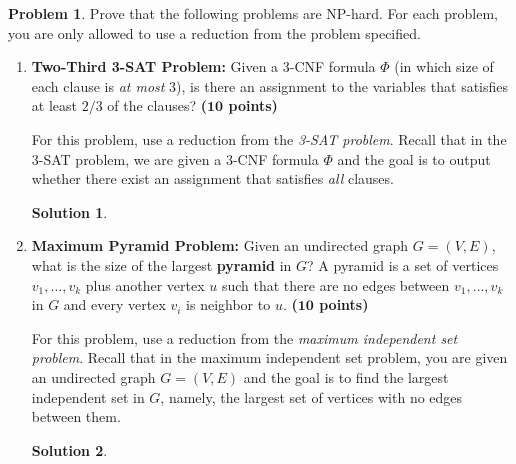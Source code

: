 \documentclass{article}
\theoremstyle{definition}
\newtheorem{problem}{Problem}
\newtheorem*{solution*}{Solution}
\newenvironment{solution}{\begin{solution*}}{{} \end{solution*}}
\newcommand{\grade}[1]{\hfill{\textbf{($\mathbf{#1}$ points)}}}
\begin{document}
\begin{problem}\label{NP}
	Prove that the following problems are NP-hard. For each problem, you are only allowed to use a reduction from the problem specified. 
	
	\begin{enumerate}[label=(\alph*)]
		\item \textbf{Two-Third 3-SAT Problem:} Given a 3-CNF formula $\Phi$ (in which size of each clause is \emph{at most} $3$), is there an assignment to the variables that satisfies at least $2/3$ of the clauses?   \grade{10}
			
		\medskip
		For this problem, use a reduction from the \emph{3-SAT problem}. Recall that in the 3-SAT problem, we are given a 3-CNF formula $\Phi$ and the goal is to output whether there exist an assignment that satisfies \emph{all} clauses. 
		
		\medskip
		\begin{solution}
		\end{solution}
		
		\newpage
\item \textbf{Maximum Pyramid Problem:} Given an undirected graph $G=(V,E)$, what is the size of the largest \textbf{pyramid} in $G$? A {pyramid} is a set of vertices $v_1,\ldots,v_k$ plus another vertex $u$ such that
		 there are no edges between $v_1,\ldots,v_k$ in $G$ and every vertex $v_i$ is neighbor to $u$. \grade{10}
	
	\medskip
		For this problem, use a reduction from the \emph{maximum independent set problem}. Recall that in the maximum independent set problem, you are given an undirected graph $G=(V,E)$ and the goal is to find the largest independent set
		in $G$, namely, the largest set of vertices with no edges between them. 
		
		\medskip
		\begin{solution}
		\end{solution}
		
	\end{enumerate}
\end{problem}


		
\newpage
\end{document}
